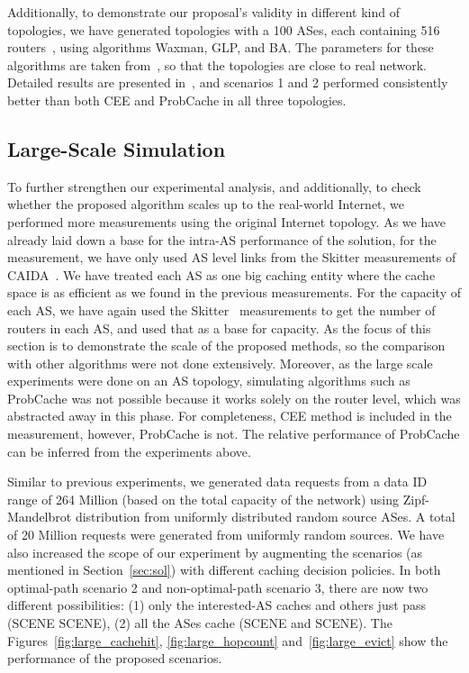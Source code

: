 \documentclass[article]{elsarticle}
\begin{document}
Additionally, to demonstrate our proposal's validity in different kind of topologies, we have generated topologies with a 100 ASes, each containing 516 routers~\cite{Arakawa2012}, using algorithms Waxman, GLP, and BA. The parameters for these algorithms are taken from~\cite{Haddadi2008}, so that the topologies are close to real network. Detailed results are presented in~\cite{myinfocom}, and scenarios 1 and 2 performed consistently better than  both CEE and ProbCache in all three topologies. 

\subsection{Large-Scale Simulation}
To further strengthen our experimental analysis, and additionally, to check whether the proposed algorithm scales up to the real-world Internet, we performed more measurements using the original Internet topology. As we have already laid down a base for the intra-AS performance of the solution, for the measurement, we have only used AS level links from the Skitter measurements of CAIDA~\cite{skitter}. We have treated each AS as one big caching entity where the cache space is as efficient as we found in the previous measurements. For the capacity of each AS, we have again used the Skitter~\cite{skitter} measurements to get the number of routers in each AS, and used that as a base for capacity. As the focus of this section is to demonstrate the scale of the proposed methods, so the comparison with other algorithms were not done extensively. Moreover, as the large scale experiments were done on an AS topology, simulating algorithms such as ProbCache was not possible because it works solely on the router level, which was abstracted away in this phase. For completeness, CEE method is included in the measurement, however, ProbCache is not. The relative performance of ProbCache can be inferred from the experiments above. 

Similar to previous experiments, we generated data requests from a data ID range of 264 Million (based on the total capacity of the network) using Zipf-Mandelbrot distribution from uniformly distributed random source ASes. A total of 20 Million requests were generated from uniformly random sources. We have also increased the scope of our experiment by augmenting the scenarios (as mentioned in Section~\ref{sec:sol}) with different caching decision policies. In both optimal-path scenario 2 and non-optimal-path scenario 3, there are now two different possibilities: (1) only the interested-AS caches and others just pass (SCENE SCENE), (2) all the ASes cache (SCENE and SCENE). The Figures~\ref{fig:large_cachehit}, \ref{fig:large_hopcount} and~\ref{fig:large_evict} show the performance of the proposed scenarios. 
\end{document}

